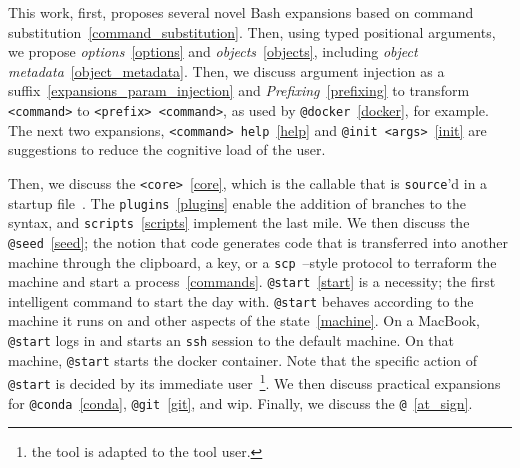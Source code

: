 This work, first, proposes several novel Bash expansions based on command substitution~\ref{command_substitution}. Then, using typed positional arguments, we propose \emph{options}~\ref{options} and \emph{objects}~\ref{objects}, including \emph{object metadata}~\ref{object_metadata}. Then, we discuss argument injection as a suffix~\ref{expansions_param_injection} and \emph{Prefixing}~\ref{prefixing} to transform \texttt{<command>} to \texttt{<prefix> <command>}, as used by \texttt{@docker}~\ref{docker}, for example. The next two expansions, \texttt{<command> help}~\ref{help} and \texttt{@init <args>}~\ref{init} are suggestions to reduce the cognitive load of the user.

Then, we discuss the \texttt{<core>}~\ref{core}, which is the callable that is \texttt{source}'d in a startup file~. The \texttt{plugins}~\ref{plugins} enable the addition of branches to the syntax, and \texttt{scripts}~\ref{scripts} implement the last mile. We then discuss the \texttt{@seed}~\ref{seed}; the notion that code generates code that is transferred into another machine through the clipboard, a key, or a \texttt{scp}~--style protocol to terraform the machine and start a process~\ref{commands}. \texttt{@start}~\ref{start} is a necessity; the first intelligent command to start the day with. \texttt{@start} behaves according to the machine it runs on and other aspects of the state~\ref{machine}. On a MacBook, \texttt{@start} logs in and starts an \texttt{ssh} session to the default machine. On that machine, \texttt{@start} starts the docker container. Note that the specific action of \texttt{@start} is decided by its immediate user~\footnote{the tool is adapted to the tool user.}. We then discuss practical expansions for \texttt{@conda}~\ref{conda}, \texttt{@git}~\ref{git}, and wip. Finally, we discuss the \texttt{@}~\ref{at_sign}.